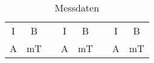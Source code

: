 \documentclass[captions=tableheading]{scrartcl}
\begin{document}


\begin{table}
  \centering
  \caption{Messdaten}
  \label{tab:some_data}
  \begin{tabular}{c c c c c c c c }
    \toprule
     I &	 B	 & & I &  B  & & I & B  \\
     A &   mT  & & A & mT  & & A & mT \\
    \midrule
      
    \bottomrule
  \end{tabular}
\end{table}

\end{document}
